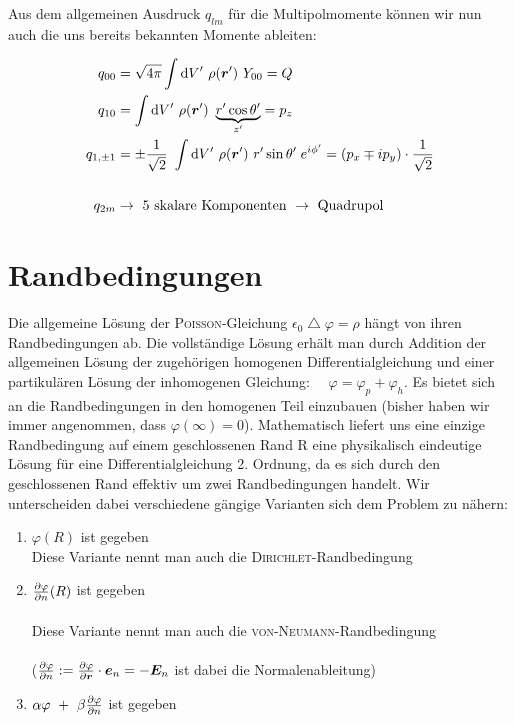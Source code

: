 Aus dem allgemeinen Ausdruck $q_{lm}$ für die Multipolmomente können wir nun auch die uns bereits bekannten Momente ableiten:

\begin{align*}
q_{00} &= \sqrt{4\pi}\int\d V' \ \rho(\vec{r}') \ Y_{00} = Q
\\
q_{10} &= \int\d V' \ \rho(\vec{r}') \ \underbrace{r'\cos\theta'}_{z'} = p_z\\
q_{1,\pm 1} &= \pm \frac{1}{\sqrt{2}} \ \int\d V' \ \rho(\vec{r}')  \ r'\sin\theta' \; e^{i\phi'} = (p_x \mp i p_y) \cdot \frac{1}{\sqrt{2}}\\
\\q_{2m} &\rightarrow \text{ 5 skalare Komponenten } \rightarrow \text{ Quadrupol}
\end{align*}

\section{Randbedingungen}

Die allgemeine Lösung der \textsc{Poisson}-Gleichung $\epsilon_0 \bigtriangleup \varphi = \rho$ hängt von ihren Randbedingungen ab. Die vollständige Lösung erhält man durch Addition der allgemeinen Lösung der zugehörigen homogenen Differentialgleichung und einer partikulären Lösung der inhomogenen Gleichung: $\quad \varphi = \varphi_p + \varphi_h$. Es bietet sich an die Randbedingungen in den homogenen Teil einzubauen (bisher haben wir immer angenommen, dass $\varphi (\infty) = 0$). Mathematisch liefert uns eine einzige Randbedingung auf einem geschlossenen Rand R eine physikalisch eindeutige Lösung für eine Differentialgleichung 2. Ordnung, da es sich durch den geschlossenen Rand effektiv um zwei Randbedingungen handelt. Wir unterscheiden dabei verschiedene gängige Varianten sich dem Problem zu nähern:


\begin{enumerate}
	\item $\varphi(R)$ ist gegeben\
	\\
	Diese Variante nennt man auch die \textsc{Dirichlet}-Randbedingung\
	
	\item $\frac{\partial{\varphi}}{\partial{n}}(R)$ ist gegeben\
	\\
	\ \\
	Diese Variante nennt man auch die \textsc{von-Neumann}-Randbedingung\
	\\
	\ \\
	($\frac{\partial{\varphi}}{\partial{n}} := \frac{\partial{\varphi}}{\partial{\bm{r}}}\cdot\bm{e}_n = - \bm{E}_n$ ist dabei die Normalenableitung)\
	
	\item $\alpha \varphi \ + \ \beta\pdiff{\varphi}{n}$ ist gegeben
\end{enumerate}

